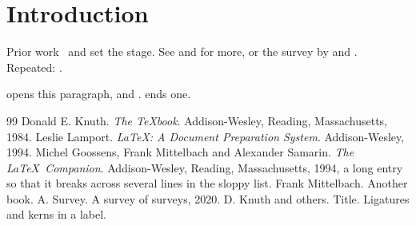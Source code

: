 \documentclass{article}
\begin{document}
\section{Introduction}
Prior work~\cite{knuth84} and \cite{lamport94,  goossens, knuth84} set the
stage. See \cite[p.~12]{lamport94} and \cite[Chapter 3]{mittelbach} for more, or
the survey by \cite{survey} and \cite{ka}.
Repeated: \cite{goossens}.

\cite{lig} opens this paragraph, and \cite{lig,ka}. ends one.

\begin{thebibliography}{99}
 Donald E. Knuth. \newblock \emph{The \TeX book}.
\newblock Addison-Wesley, Reading, Massachusetts, 1984.
Leslie Lamport. \emph{\LaTeX: A Document Preparation System}. Addison-Wesley, 1994.
 Michel Goossens, Frank Mittelbach and Alexander Samarin.
\emph{The \LaTeX\ Companion}. Addison-Wesley, Reading, Massachusetts, 1994, a long
entry so that it breaks across several lines in the sloppy list.
 Frank Mittelbach. Another book.
 A. Survey. A survey of surveys, 2020.
 D. Knuth and others. Title.
 Ligatures and kerns in a label.
\end{thebibliography}
\end{document}
